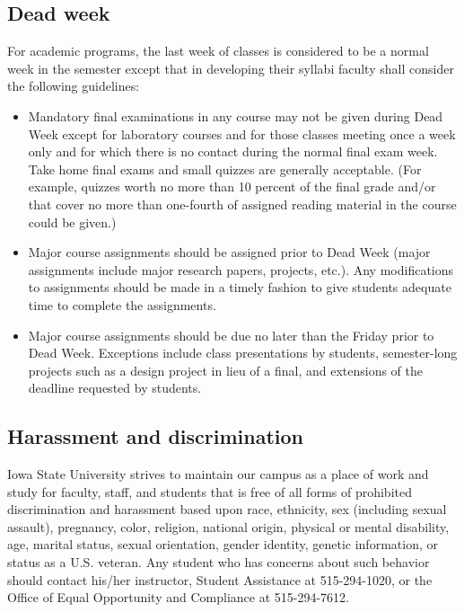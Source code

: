 \subsection*{Dead week}

For academic programs, the last week of classes is considered to be a
normal week in the semester except that in developing their syllabi
faculty shall consider the following guidelines:

\begin{itemize}
\item Mandatory final examinations in any course may not be given
  during Dead Week except for laboratory courses and for those classes
  meeting once a week only and for which there is no contact during
  the normal final exam week. Take home final exams and small quizzes
  are generally acceptable. (For example, quizzes worth no more than
  10 percent of the final grade and/or that cover no more than
  one-fourth of assigned reading material in the course could be
  given.)
\item Major course assignments should be assigned prior to Dead Week
  (major assignments include major research papers, projects,
  etc.). Any modifications to assignments should be made in a timely
  fashion to give students adequate time to complete the assignments.
\item Major course assignments should be due no later than the Friday
  prior to Dead Week. Exceptions include class presentations by
  students, semester-long projects such as a design project in lieu of
  a final, and extensions of the deadline requested by students.
\end{itemize}

\subsection*{Harassment and discrimination}

Iowa State University strives to maintain our campus as a place of
work and study for faculty, staff, and students that is free of all
forms of prohibited discrimination and harassment based upon race,
ethnicity, sex (including sexual assault), pregnancy, color, religion,
national origin, physical or mental disability, age, marital status,
sexual orientation, gender identity, genetic information, or status as
a U.S. veteran. Any student who has concerns about such behavior
should contact his/her instructor, Student Assistance at 515-294-1020,
or the Office of Equal Opportunity and Compliance at 515-294-7612.

